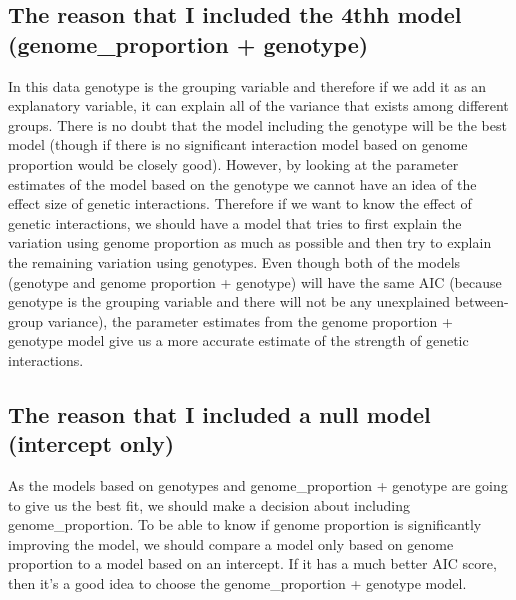 \documentclass[
]{article}
\begin{document}
\hypertarget{the-reason-that-i-included-the-4thh-model-genome_proportion-genotype}{%
\subsection{The reason that I included the 4thh model
(genome\_proportion +
genotype)}\label{the-reason-that-i-included-the-4thh-model-genome_proportion-genotype}}

In this data genotype is the grouping variable and therefore if we add
it as an explanatory variable, it can explain all of the variance that
exists among different groups. There is no doubt that the model
including the genotype will be the best model (though if there is no
significant interaction model based on genome proportion would be
closely good). However, by looking at the parameter estimates of the
model based on the genotype we cannot have an idea of the effect size of
genetic interactions. Therefore if we want to know the effect of genetic
interactions, we should have a model that tries to first explain the
variation using genome proportion as much as possible and then try to
explain the remaining variation using genotypes. Even though both of the
models (genotype and genome proportion + genotype) will have the same
AIC (because genotype is the grouping variable and there will not be any
unexplained between-group variance), the parameter estimates from the
genome proportion + genotype model give us a more accurate estimate of
the strength of genetic interactions.

\hypertarget{the-reason-that-i-included-a-null-model-intercept-only}{%
\subsection{The reason that I included a null model (intercept
only)}\label{the-reason-that-i-included-a-null-model-intercept-only}}

As the models based on genotypes and genome\_proportion + genotype are
going to give us the best fit, we should make a decision about including
genome\_proportion. To be able to know if genome proportion is
significantly improving the model, we should compare a model only based
on genome proportion to a model based on an intercept. If it has a much
better AIC score, then it's a good idea to choose the genome\_proportion
+ genotype model.
\end{document}
